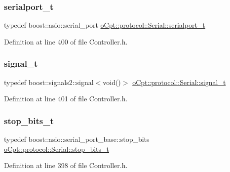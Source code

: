 \subsubsection{\texorpdfstring{serialport\+\_\+t}{serialport\_t}}
{\footnotesize\ttfamily typedef boost\+::asio\+::serial\+\_\+port \hyperlink{classo_cpt_1_1protocol_1_1_serial_a3949fae08041279672bcb29b94d4cd52}{o\+Cpt\+::protocol\+::\+Serial\+::serialport\+\_\+t}}



Definition at line 400 of file Controller.\+h.

\hypertarget{classo_cpt_1_1protocol_1_1_serial_a53a2b70ff50e141214acfa50bbd232a8}{}\label{classo_cpt_1_1protocol_1_1_serial_a53a2b70ff50e141214acfa50bbd232a8} 
\subsubsection{\texorpdfstring{signal\+\_\+t}{signal\_t}}
{\footnotesize\ttfamily typedef boost\+::signals2\+::signal$<$void()$>$ \hyperlink{classo_cpt_1_1protocol_1_1_serial_a53a2b70ff50e141214acfa50bbd232a8}{o\+Cpt\+::protocol\+::\+Serial\+::signal\+\_\+t}}



Definition at line 401 of file Controller.\+h.

\hypertarget{classo_cpt_1_1protocol_1_1_serial_aadc4c803ade35920211e6c6a202a8c1f}{}\label{classo_cpt_1_1protocol_1_1_serial_aadc4c803ade35920211e6c6a202a8c1f} 
\subsubsection{\texorpdfstring{stop\+\_\+bits\+\_\+t}{stop\_bits\_t}}
{\footnotesize\ttfamily typedef boost\+::asio\+::serial\+\_\+port\+\_\+base\+::stop\+\_\+bits \hyperlink{classo_cpt_1_1protocol_1_1_serial_aadc4c803ade35920211e6c6a202a8c1f}{o\+Cpt\+::protocol\+::\+Serial\+::stop\+\_\+bits\+\_\+t}}



Definition at line 398 of file Controller.\+h.




